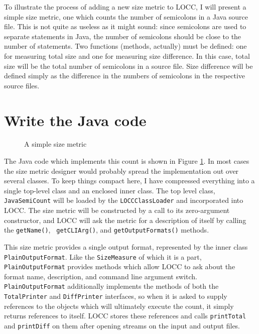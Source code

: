 To illustrate the process of adding a new size metric to LOCC, I will
present a simple size metric, one which counts the number of semicolons in
a Java source file.  This is not quite as useless as it might sound: since
semicolons are used to separate statements in Java, the number of
semicolons should be close to the number of statements.  Two functions
(methods, actually) must be defined: one for measuring total size and one
for measuring size difference.  In this case, total size will be the total
number of semicolons in a source file.  Size difference will be defined
simply as the difference in the numbers of semicolons in the respective
source files.

\section{Write the Java code}

%
\begin{figure}
  \centering
  
  \caption{A simple size metric}
  \label{fig:locc-ext}
\end{figure}

The Java code which implements this count is shown in Figure
\ref{fig:locc-ext}. In most cases the size metric designer would
probably spread the implementation out over several classes.  To keep
things compact here, I have compressed everything into a single
top-level class and an enclosed inner class.  The top level class,
{\tt JavaSemiCount} will be loaded by the {\tt LOCCClassLoader} and
incorporated into LOCC.  The size metric will be constructed by a call
to its zero-argument constructor, and LOCC will ask the metric for a
description of itself by calling the {\tt getName()}, {\tt
  getCLIArg()}, and {\tt getOutputFormats()} methods.  


This size metric provides a single output format, represented by the
inner class {\tt PlainOutputFormat}.  Like the {\tt SizeMeasure} of which it 
is a part, {\tt PlainOutputFormat} provides methods which allow LOCC
to ask about the format name, description, and command line argument
switch.  {\tt PlainOutputFormat} additionally implements the methods of 
both the {\tt TotalPrinter} and {\tt DiffPrinter} interfaces, so when
it is asked to supply references to the objects which will ultimately 
execute the count, it simply returns references to itself.  LOCC
stores these references and calls {\tt printTotal} and {\tt printDiff} 
on them after opening streams on the input and output files.


